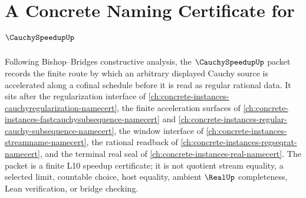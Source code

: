 \chapter{A Concrete Naming Certificate for $\CauchySpeedupUp$}
\label{ch:concrete-instances-cauchy-speedup-namecert}

Following Bishop--Bridges constructive analysis, the $\CauchySpeedupUp$ packet records the finite route by which an arbitrary displayed Cauchy source is accelerated along a cofinal schedule before it is read as regular rational data. It sits after the regularization interface of \autoref{ch:concrete-instances-cauchyregularization-namecert}, the finite acceleration surfaces of \autoref{ch:concrete-instances-fastcauchysubsequence-namecert} and \autoref{ch:concrete-instances-regular-cauchy-subsequence-namecert}, the window interface of \autoref{ch:concrete-instances-streamname-namecert}, the rational readback of \autoref{ch:concrete-instances-regseqrat-namecert}, and the terminal real seal of \autoref{ch:concrete-instances-real-namecert}. The packet is a finite L10 speedup certificate; it is not quotient stream equality, a selected limit, countable choice, host equality, ambient $\RealUp$ completeness, Lean verification, or bridge checking.

